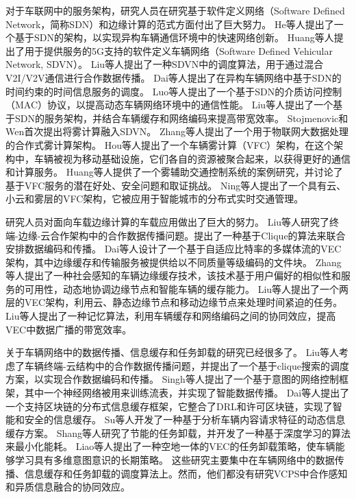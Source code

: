 对于车联网中的服务架构，研究人员在研究基于软件定义网络（Software Defined Network，简称SDN）和边缘计算的范式方面付出了巨大努力。
He等人\cite{he2016sdvn}提出了一个基于SDN的架构，以实现异构车辆通信环境中的快速网络创新。
Huang等人\cite{huang2017exploring}提出了用于提供服务的5G支持的软件定义车辆网络（Software Defined Vehicular Network, SDVN）。
Liu等人\cite{liu2016cooperative}提出了一种SDVN中的调度算法，用于通过混合V2I/V2V通信进行合作数据传播。
Dai等人\cite{dai2018cooperative}提出了在异构车辆网络中基于SDN的时间约束的时间信息服务的调度。
Luo等人\cite{luo2018sdnmac}提出了一个基于SDN的介质访问控制（MAC）协议，以提高动态车辆网络环境中的通信性能。
Liu等人\cite{liu2018coding}提出了一个基于SDN的服务架构，并结合车辆缓存和网络编码来提高带宽效率。
Stojmenovic和Wen\cite{stojmenovic2014the}首次提出将雾计算融入SDVN。
Zhang等人\cite{zhang2017cooperative}提出了一个用于物联网大数据处理的合作式雾计算架构。
Hou等人\cite{hou2016vehicular}提出了一个车辆雾计算（VFC）架构，在这个架构中，车辆被视为移动基础设施，它们各自的资源被聚合起来，以获得更好的通信和计算服务。
Huang等人\cite{huang2017vehicular}提供了一个雾辅助交通控制系统的案例研究，并讨论了基于VFC服务的潜在好处、安全问题和取证挑战。
Ning等人\cite{ning2019vehicular}提出了一个具有云、小云和雾层的VFC架构，它被应用于智能城市的分布式实时交通管理。

研究人员对面向车载边缘计算的车载应用做出了巨大的努力。
Liu等人\cite{liu2021fog}研究了终端-边缘-云合作架构中的合作数据传播问题。提出了一种基于Clique的算法来联合安排数据编码和传播。
Dai等人\cite{dai2021edge}设计了一个基于自适应比特率的多媒体流的VEC架构，其中边缘缓存和传输服务被提供给以不同质量等级编码的文件块。
Zhang等人\cite{zhang2022digital}提出了一种社会感知的车辆边缘缓存技术，该技术基于用户偏好的相似性和服务的可用性，动态地协调边缘节点和智能车辆的缓存能力。
Liu等人\cite{liu2020adaptive}提出了一个两层的VEC架构，利用云、静态边缘节点和移动边缘节点来处理时间紧迫的任务。
Liu等人\cite{liu2018coding}提出了一种记忆算法，利用车辆缓存和网络编码之间的协同效应，提高VEC中数据广播的带宽效率。

关于车辆网络中的数据传播、信息缓存和任务卸载的研究已经很多了。
Liu等人\cite{liu2021fog}考虑了车辆终端-云结构中的合作数据传播问题，并提出了一个基于clique搜索的调度方案，以实现合作数据编码和传播。
Singh等人\cite{singh2020intent}提出了一个基于意图的网络控制框架，其中一个神经网络被用来训练流表，并实现了智能数据传播。
Dai等人\cite{dai2020deep}提出了一个支持区块链的分布式信息缓存框架，它整合了DRL和许可区块链，实现了智能和安全的信息缓存。
Su等人\cite{su2018an}开发了一种基于分析车辆内容请求特征的动态信息缓存方案。
Shang等人\cite{shang2021deep}研究了节能的任务卸载，并开发了一种基于深度学习的算法来最小化能耗。
Liao等人\cite{liao2021learning}提出了一种空地一体的VEC的任务卸载策略，使车辆能够学习具有多维意图意识的长期策略。
这些研究主要集中在车辆网络中的数据传播、信息缓存和任务卸载的调度算法上。然而，他们都没有研究VCPS中合作感知和异质信息融合的协同效应。


